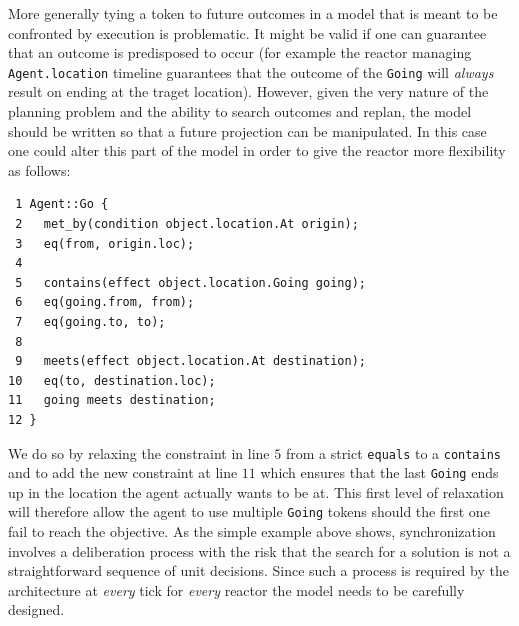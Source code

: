 More generally tying a token to future outcomes in a model that is
meant to be confronted by execution is problematic. It might be valid
if one can guarantee that an outcome is predisposed to occur (for
example the reactor managing \texttt{Agent.location} timeline
guarantees that the outcome of the \texttt{Going} will {\em always}
result on ending at the traget location). However, given the very
nature of the planning problem and the ability to search outcomes and
replan, the model should be written so that a future projection can be
manipulated. %
In this case one could alter this part of the model in order to give
the reactor more flexibility as follows:

\begin{verbatim}
 1 Agent::Go {
 2   met_by(condition object.location.At origin);
 3   eq(from, origin.loc);
 4
 5   contains(effect object.location.Going going);
 6   eq(going.from, from);
 7   eq(going.to, to);
 8   
 9   meets(effect object.location.At destination);
10   eq(to, destination.loc);
11   going meets destination;
12 }
\end{verbatim}

We do so by relaxing the constraint in line $5$ from a strict
\texttt{equals} to a \texttt{contains} and to add the new constraint
at line $11$ which ensures that the last \texttt{Going} ends up in the
location the agent actually wants to be at. This first level of
relaxation will therefore allow the agent to use multiple
\texttt{Going} tokens should the first one fail to reach the
objective.  %
As the simple example above shows, synchronization involves a
deliberation process with the risk that the search for a solution is
not a straightforward sequence of unit decisions. Since such a process
is required by the architecture at \emph{every} tick for \emph{every}
reactor the model needs to be carefully designed.

